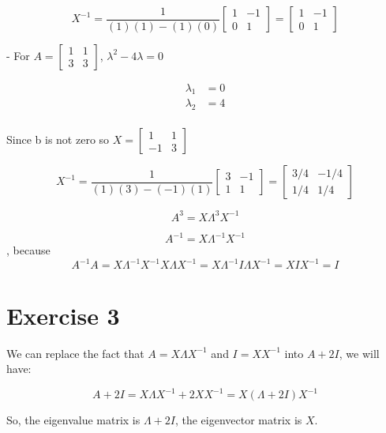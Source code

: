 \documentclass{article}
\begin{document}
\[
X^{-1} = \frac{1}{(1)(1) - (1)(0)} \begin{bmatrix} 1 & -1 \\ 0 & 1 \end{bmatrix} = \begin{bmatrix} 1 & -1 \\ 0 & 1 \end{bmatrix}
\]

- For \( A = \begin{bmatrix} 1 & 1 \\ 3 & 3 \end{bmatrix} \), \( \lambda^2 - 4\lambda = 0 \)

\[
\begin{aligned}
    \lambda_1 &= 0 \\
    \lambda_2 &= 4 \\
\end{aligned}
\]

Since b is not zero so \( X = \begin{bmatrix} 1 & 1 \\ -1 & 3 \end{bmatrix} \)

\[
X^{-1} = \frac{1}{(1)(3) - (-1)(1)} \begin{bmatrix} 3 & -1 \\ 1 & 1 \end{bmatrix} = \begin{bmatrix} 3/4 & -1/4 \\ 1/4 & 1/4 \end{bmatrix}
\]

\[
A^{3} = X\Lambda^{3}X^{-1}
\]

\[ A^{-1} = X \Lambda^{-1} X^{-1} \], because \[ A^{-1} A = X \Lambda^{-1} X^{-1} X \Lambda X^{-1} = X \Lambda^{-1} I \Lambda X^{-1} = X I X^{-1} = I \]

\section*{Exercise 3}

We can replace the fact that \( A = X \Lambda X^{-1} \) and \( I = X X^{-1} \) into \( A + 2I \), we will have:

\[
A + 2I = X \Lambda X^{-1} + 2 X X^{-1}
= X (\Lambda + 2I) X^{-1}
\]

So, the eigenvalue matrix is \( \Lambda + 2I \), the eigenvector matrix is \( X \).
\end{document}
